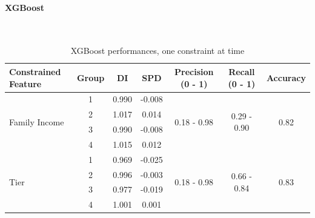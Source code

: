 \documentclass{article}
\begin{document}
\paragraph{XGBoost}\mbox{}\\
\begin{table}[H]
\caption{XGBoost performances, one constraint at time}
\begin{tabular}{lccc|ccc}
\hline
\textbf{Constrained Feature} & \textbf{Group} & \textbf{DI} & \textbf{SPD} & \textbf{Precision (0 - 1)} & \textbf{Recall (0 - 1)} & \textbf{Accuracy} \\
\hline
\multirow{4}{*}{Family Income} & 1     & 0.990                  & -0.008                     & \multirow{4}{*}{0.18 - 0.98}                     & \multirow{4}{*}{0.29 - 0.90}                    & \multirow{4}{*}{0.82}                     \\
                               & 2     & 1.017                  & 0.014                      &                                                  &                                                 &                                           \\
                               & 3     & 0.990                  & -0.008                     &                                                  &                                                 &                                           \\
                               & 4     & 1.015                  & 0.012                      &                                                  &                                                 &                                           \\
\hline
\multirow{5}{*}{Tier}          & 1     & 0.969                  & -0.025                     & \multirow{5}{*}{0.18 - 0.98}                     & \multirow{5}{*}{0.66 - 0.84}                    & \multirow{5}{*}{0.83}                     \\
                               & 2     & 0.996                  & -0.003                     &                                                  &                                                 &                                           \\
                               & 3     & 0.977                  & -0.019                     &                                                  &                                                 &                                           \\
                               & 4     & 1.001                  & 0.001                      &                                                  &                                                 &                                           \\

\end{tabular}
\end{table}
\end{document}
